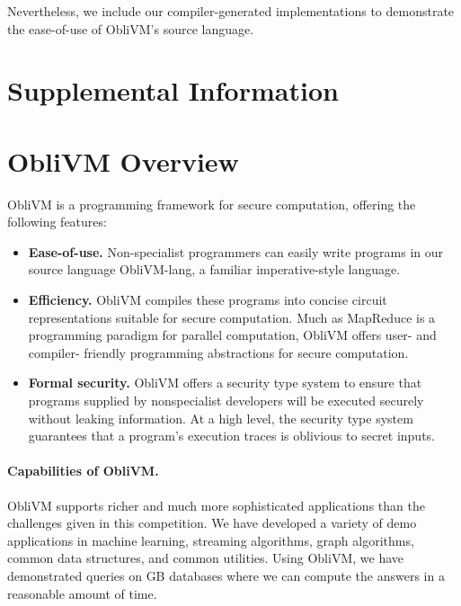 \documentclass[11pt]{article}
\begin{document}
Nevertheless, we include our compiler-generated implementations
to demonstrate the ease-of-use of {\sf ObliVM}'s source language.







\appendix

\section*{Supplemental Information}
\section{{\sf ObliVM} Overview}

{\sf ObliVM} is a programming framework for secure computation, offering the 
following features:
\begin{itemize}
\item
{\bf Ease-of-use.} Non-specialist programmers can easily 
write programs in our source language {\sf ObliVM-lang}, a 
familiar imperative-style language.
\item
{\bf Efficiency.} {\sf ObliVM} compiles these programs into 
concise circuit representations suitable for secure computation. 
Much as MapReduce is a programming paradigm for 
parallel computation, {\sf ObliVM} offers user- and compiler- friendly
programming abstractions for secure computation.
\item
{\bf Formal security.}
{\sf ObliVM} offers a security type system to ensure 
that programs supplied by nonspecialist developers
will be executed securely without leaking information.
At a high level, the security type system guarantees
that a program's execution traces 
is oblivious to secret inputs.
\end{itemize}

\paragraph{Capabilities of {\sf ObliVM}.} 
{\sf ObliVM} supports richer and much more sophisticated applications
than the challenges given in this competition.
We have developed a variety of demo applications in machine learning,
streaming algorithms, graph algorithms, 
common data structures, and common utilities.
Using {\sf ObliVM}, we have demonstrated queries on {\sf GB} 
databases where we can compute the answers in a reasonable amount of time. 
\end{document}
